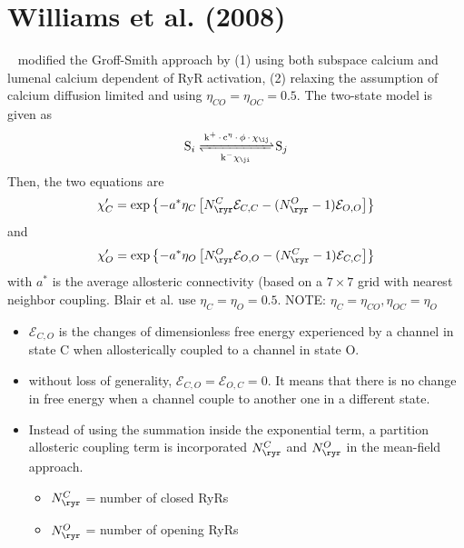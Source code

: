 \section{Williams et al. (2008)}
\label{sec:williams-et-al-1}

~\citep{williams2007pda, williams2008mclc} modified the Groff-Smith approach
by (1) using both subspace calcium and lumenal calcium dependent of RyR
activation, (2) relaxing the assumption of calcium diffusion limited and using
$\eta_{CO}=\eta_{OC}=0.5$. The two-state model is given
as
\begin{equation}
  \label{eq:1217}
  \ce{S_i <=>[\ce{k^+.c^\eta.\phi.\chi_\ij}][\ce{k^-\chi_\ji}] S_j}
\end{equation}
Then, the two equations are
\begin{equation}
  \label{eq:1124}
  \chi'_C = \exp\left\{-a^*\eta_C\left[N^C_\ryr \mathcal{E}_{C,C} - (N^O_\ryr-1)\mathcal{E}_{O,O}\right]\right\}
\end{equation}
and
\begin{equation}
  \label{eq:1125}
  \chi'_O = \exp\left\{-a^*\eta_O\left[N^O_\ryr \mathcal{E}_{O,O} - (N^C_\ryr-1)\mathcal{E}_{C,C}\right]\right\}
\end{equation}
with $a^*$ is the average allosteric connectivity (based on a $7\times
7$ grid with nearest neighbor coupling. Blair et al. use
$\eta_{C}=\eta_O=0.5$. NOTE: $\eta_{C}=\eta_{CO}, \eta_{OC}=\eta_O$


\begin{itemize}
\item $\mathcal{E}_{C,O}$ is the changes of dimensionless free energy
  experienced by a channel in state C when allosterically coupled to a
  channel in state O.

\item without loss of generality, $\mathcal{E}_{C,O} =
  \mathcal{E}_{O,C}=0$. It means that there is no change in free
  energy when a channel couple to another one in a different state.

\item Instead of using the summation inside the exponential term, a
  partition allosteric coupling term is incorporated $N^C_\ryr$ and
  $N^O_\ryr$ in the mean-field approach.
  \begin{itemize}
  \item $N^C_\ryr$ = number of closed RyRs

  \item $N^O_\ryr$ = number of opening RyRs
  \end{itemize}
\end{itemize}


